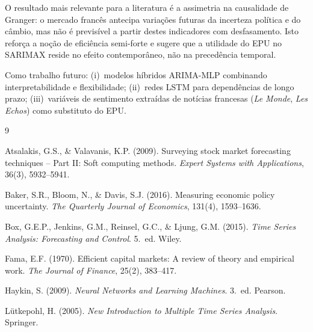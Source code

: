 \documentclass[12pt,a4paper]{article}
\begin{document}
O resultado mais relevante para a literatura é a assimetria na causalidade de Granger: o mercado francês antecipa variações futuras da incerteza política e do câmbio, mas não é previsível a partir destes indicadores com desfasamento. Isto reforça a noção de eficiência semi-forte e sugere que a utilidade do EPU no SARIMAX reside no efeito contemporâneo, não na precedência temporal.

Como trabalho futuro: (i)~modelos híbridos ARIMA-MLP combinando interpretabilidade e flexibilidade; (ii)~redes LSTM para dependências de longo prazo; (iii)~variáveis de sentimento extraídas de notícias francesas (\textit{Le Monde}, \textit{Les Echos}) como substituto do EPU.

\newpage
{}
{}
\begingroup
\small

\begin{thebibliography}{9}

Atsalakis, G.S., \& Valavanis, K.P. (2009).
Surveying stock market forecasting techniques -- Part II: Soft computing methods.
\textit{Expert Systems with Applications}, 36(3), 5932--5941.

Baker, S.R., Bloom, N., \& Davis, S.J. (2016).
Measuring economic policy uncertainty.
\textit{The Quarterly Journal of Economics}, 131(4), 1593--1636.

Box, G.E.P., Jenkins, G.M., Reinsel, G.C., \& Ljung, G.M. (2015).
\textit{Time Series Analysis: Forecasting and Control}. 5.\textordfeminine~ed. Wiley.

Fama, E.F. (1970).
Efficient capital markets: A review of theory and empirical work.
\textit{The Journal of Finance}, 25(2), 383--417.

Haykin, S. (2009).
\textit{Neural Networks and Learning Machines}. 3.\textordfeminine~ed. Pearson.

L\"{u}tkepohl, H. (2005).
\textit{New Introduction to Multiple Time Series Analysis}. Springer.

\end{thebibliography}
\endgroup

\newpage
\appendix
\end{document}
